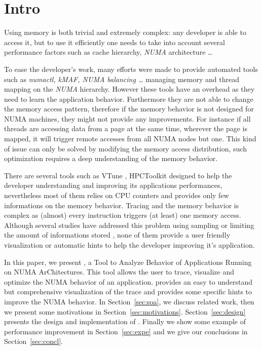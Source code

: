 
\section{Intro}
\label{sec:intro}

Using memory is both trivial and extremely complex: any developer is able to
access it, but to use it efficiently one needs to take into account several
performance factors such as cache hierarchy, \emph{NUMA} architecture
\cite{Drepper07What} \ldots

To ease the developer's work, many efforts were made to provide automated
tools such as \emph{numactl, kMAF, NUMA balancing \ldots}
managing memory and thread mapping on the \emph{NUMA} hierarchy. However these
tools have an overhead as they need to learn the application behavior.
Furthermore they are not able to change the memory access pattern, therefore
if the memory behavior is not designed for NUMA machines, they might not
provide any improvements. For instance if all threads are accessing data from a
page at the same time, wherever the page is mapped, it will trigger remote
accesses from all NUMA nodes but one. This kind of issue can only be solved by
modifying the memory access distribution, such optimization requires a deep
understanding of the memory behavior.

There are several tools such as VTune \cite{Reinders05VTune},
HPCToolkit\cite{Adhianto10HPCTOOLKIT}  designed to help the
developer understanding and improving its applications performances,
nevertheless most of them relies on CPU counters and provides only few
informations on the memory behavior. Tracing and the memory behavior is
complex as (almost) every instruction triggers (at least) one memory access.
Although several studies have addressed this problem using sampling
\cite{Lachaize12MemProf} or limiting the amount of informations stored
, none of them provide a user friendly visualization or automatic hints
to help the developer improving it's application.


In this paper, we present \TABARNAC, a Tool to Analyze Behavior of
Applications Running on NUMA ArChitectures. This tool allows the user to
trace, visualize and optimize the NUMA behavior of an application.
\TABARNAC provides an easy to understand but comprehensive visualization of the trace and
provides some specific hints to improve the NUMA behavior. In Section~\ref{sec:soa}, we discuss related work, then we present some motivations in
Section~\ref{sec:motivations}. Section~\ref{sec:design} presents the design and implementation of \TABARNAC. Finally we show some example of performance improvement in Section~\ref{sec:expe} and we give our conclusions in Section~\ref{sec:concl}.

